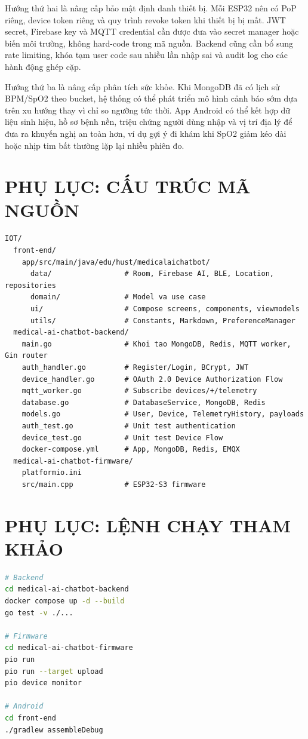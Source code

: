 \documentclass[a4paper,13pt,3p,oneside]{report}
\begin{document}
Hướng thứ hai là nâng cấp bảo mật định danh thiết bị. Mỗi ESP32 nên có PoP riêng, device token riêng và quy trình revoke token khi thiết bị bị mất. JWT secret, Firebase key và MQTT credential cần được đưa vào secret manager hoặc biến môi trường, không hard-code trong mã nguồn. Backend cũng cần bổ sung rate limiting, khóa tạm user code sau nhiều lần nhập sai và audit log cho các hành động ghép cặp.

Hướng thứ ba là nâng cấp phân tích sức khỏe. Khi MongoDB đã có lịch sử BPM/SpO2 theo bucket, hệ thống có thể phát triển mô hình cảnh báo sớm dựa trên xu hướng thay vì chỉ so ngưỡng tức thời. App Android có thể kết hợp dữ liệu sinh hiệu, hồ sơ bệnh nền, triệu chứng người dùng nhập và vị trí địa lý để đưa ra khuyến nghị an toàn hơn, ví dụ gợi ý đi khám khi SpO2 giảm kéo dài hoặc nhịp tim bất thường lặp lại nhiều phiên đo.

\newpage
\appendix
\chapter{PHỤ LỤC: CẤU TRÚC MÃ NGUỒN}
\begin{lstlisting}
IOT/
  front-end/
    app/src/main/java/edu/hust/medicalaichatbot/
      data/                 # Room, Firebase AI, BLE, Location, repositories
      domain/               # Model va use case
      ui/                   # Compose screens, components, viewmodels
      utils/                # Constants, Markdown, PreferenceManager
  medical-ai-chatbot-backend/
    main.go                 # Khoi tao MongoDB, Redis, MQTT worker, Gin router
    auth_handler.go         # Register/Login, BCrypt, JWT
    device_handler.go       # OAuth 2.0 Device Authorization Flow
    mqtt_worker.go          # Subscribe devices/+/telemetry
    database.go             # DatabaseService, MongoDB, Redis
    models.go               # User, Device, TelemetryHistory, payloads
    auth_test.go            # Unit test authentication
    device_test.go          # Unit test Device Flow
    docker-compose.yml      # App, MongoDB, Redis, EMQX
  medical-ai-chatbot-firmware/
    platformio.ini
    src/main.cpp            # ESP32-S3 firmware
\end{lstlisting}

\chapter{PHỤ LỤC: LỆNH CHẠY THAM KHẢO}
\begin{lstlisting}[language=bash]
# Backend
cd medical-ai-chatbot-backend
docker compose up -d --build
go test -v ./...

# Firmware
cd medical-ai-chatbot-firmware
pio run
pio run --target upload
pio device monitor

# Android
cd front-end
./gradlew assembleDebug
\end{lstlisting}
\end{document}
